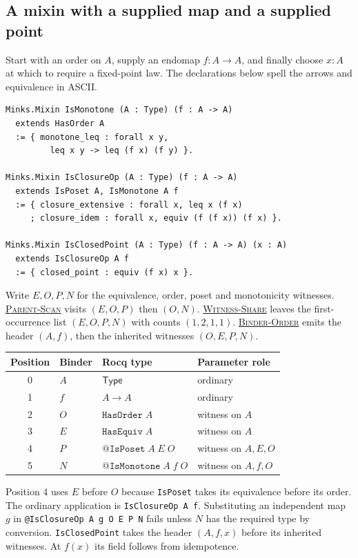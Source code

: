 \documentclass{article}
\newcommand{\ttt}[1]{\texttt{#1}}
\newcommand{\ruse}[1]{\hyperlink{rule-#1}{\textsc{#1}}}
\begin{document}
\subsection{A mixin with a supplied map and a supplied point}
\label{ex:closure}
Start with an order on $A$, supply an endomap $f:A\to A$,
and finally choose $x:A$ at which to require a fixed-point law.
The declarations below spell the arrows and equivalence in ASCII.
\begin{verbatim}
Minks.Mixin IsMonotone (A : Type) (f : A -> A)
  extends HasOrder A
  := { monotone_leq : forall x y,
         leq x y -> leq (f x) (f y) }.

Minks.Mixin IsClosureOp (A : Type) (f : A -> A)
  extends IsPoset A, IsMonotone A f
  := { closure_extensive : forall x, leq x (f x)
     ; closure_idem : forall x, equiv (f (f x)) (f x) }.

Minks.Mixin IsClosedPoint (A : Type) (f : A -> A) (x : A)
  extends IsClosureOp A f
  := { closed_point : equiv (f x) x }.
\end{verbatim}
Write $E,O,P,N$ for the equivalence, order, poset and monotonicity
witnesses. \ruse{Parent-Scan} visits $(E,O,P)$ then $(O,N)$.
\ruse{Witness-Share} leaves the first-occurrence list $(E,O,P,N)$
with counts $(1,2,1,1)$. \ruse{Binder-Order} emits the header $(A,f)$, then the
inherited witnesses $(O,E,P,N)$.

\begin{center}
\begin{tabular}{@{}clll@{}}
Position & Binder & Rocq type & Parameter role\\
\hline
0 & $A$ & $\mathsf{Type}$ & ordinary\\
1 & $f$ & $A\to A$ & ordinary\\
2 & $O$ & $\ttt{HasOrder}\;A$ & witness on $A$\\
3 & $E$ & $\ttt{HasEquiv}\;A$ & witness on $A$\\
4 & $P$ & $\ttt{@IsPoset}\;A\;E\;O$ & witness on $A, E, O$\\
5 & $N$ & $\ttt{@IsMonotone}\;A\;f\;O$ & witness on $A, f, O$
\end{tabular}
\end{center}
Position 4 uses $E$ before $O$ because \ttt{IsPoset} takes its
equivalence before its order. The ordinary application is
\ttt{IsClosureOp A f}. Substituting an independent map $g$ in
\ttt{@IsClosureOp A g O E P N} fails unless $N$ has the required
type by conversion. \ttt{IsClosedPoint} takes the header $(A,f,x)$ before its
inherited witnesses. At $f(x)$ its field follows from idempotence.
\end{document}
